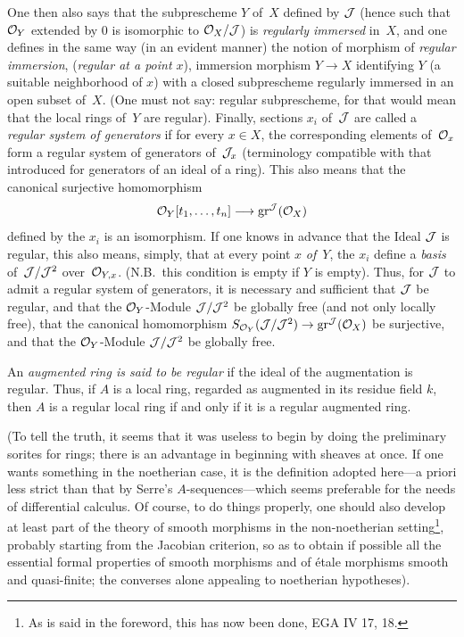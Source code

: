 \begin{remarks}
One
then also says that the subprescheme $Y$ of~$X$ defined
by $\cal{J}$ (hence such that $\cal{O}_Y$ extended by $0$ is
isomorphic to $\cal{O}_X/\cal{J}$) is \emph{regularly
immersed}
in~$X$, and one defines in the same way (in an evident
manner) the notion of morphism of \emph{regular
immersion},
(\resp \emph{regular at a point $x$}),
immersion morphism $Y\to X$ identifying $Y$ (\resp a suitable neighborhood of
$x$) with a closed subprescheme regularly
immersed in an open subset of~$X$. (One must not say:
regular subprescheme, for that would mean that the
local rings of~$Y$ are regular). Finally, sections $x_i$
of~$\cal{J}$ are called a \emph{regular system of
generators} if for every $x\in X$, the corresponding
elements of~$\cal{O}_x$ form a regular system of
generators of~$\cal{J}_x$ (terminology compatible with that
introduced for generators of an ideal of a
ring). This also means that the canonical surjective homomorphism
\[
\cal{O}_Y[t_1,\dots,t_n] \to \gr^{\cal{J}} (\cal{O}_X)
\]
defined by the $x_i$ is an isomorphism. If one knows in advance
that the Ideal $\cal{J}$ is regular, this also means,
simply, that at every point $x$ \emph{of~$Y$}, the $x_i$
define a \emph{basis} of~$\cal{J}/\cal{J}^2$ over~$\cal{O}_{Y,x}$. (N.B.\ this condition is empty if $Y$ is
empty). Thus, for $\cal{J}$ to admit a regular
system of generators, it is necessary and sufficient that $\cal{J}$ be
regular, and that the $\cal{O}_Y$-Module $\cal{J} /\cal{J}^2$ be
globally free (and not only locally free), \ie that
the canonical homomorphism $S_{\cal{O}_Y}(\cal{J}/\cal{J}^2) \to
\gr^{\cal{J}} (\cal{O}_X)$ be surjective, and that the
$\cal{O}_Y$-Module $\cal{J}/\cal{J}^2$ be globally free.

An \emph{augmented ring is said to be regular}
if the ideal of the augmentation is regular. Thus, if $A$ is
a local ring, regarded as augmented in its residue
field $k$, then $A$ is a regular local ring if and
only if it is a regular augmented ring.

(To tell the truth, it seems that it was useless to begin by
doing the preliminary sorites for rings; there is an
advantage in beginning with sheaves at once. If
one wants something in the noetherian case, it is the
definition adopted here---a priori less strict than that by
Serre's $A$-sequences---which seems preferable for the
needs of differential calculus. Of course, to do things properly, one
should also develop at least part of the theory
of smooth morphisms in the non-noetherian setting\footnote{As
is said in the foreword, this has now been done, \cf EGA
IV 17, 18.}, probably
starting from the Jacobian criterion, so as to obtain if
possible all the essential formal properties of
smooth morphisms and of \'etale morphisms \ie smooth and
quasi-finite; the converses alone appealing to
noetherian hypotheses).
\end{remarks}
